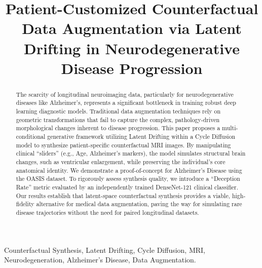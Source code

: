 \documentclass[conference]{IEEEtran}
\begin{document}
\title{Patient-Customized Counterfactual Data Augmentation via Latent Drifting in Neurodegenerative Disease Progression\\
}

\author{
}

\maketitle

\begin{abstract}
The scarcity of longitudinal neuroimaging data, particularly for neurodegenerative diseases like Alzheimer's, represents a significant bottleneck in training robust deep learning diagnostic models. Traditional data augmentation techniques rely on geometric transformations that fail to capture the complex, pathology-driven morphological changes inherent to disease progression. This paper proposes a multi-conditional generative framework utilizing Latent Drifting within a Cycle Diffusion model to synthesize patient-specific counterfactual MRI images. By manipulating clinical ``sliders'' (e.g., Age, Alzheimer's markers), the model simulates structural brain changes, such as ventricular enlargement, while preserving the individual's core anatomical identity. We demonstrate a proof-of-concept for Alzheimer's Disease using the OASIS dataset. To rigorously assess synthesis quality, we introduce a ``Deception Rate'' metric evaluated by an independently trained DenseNet-121 clinical classifier. Our results establish that latent-space counterfactual synthesis provides a viable, high-fidelity alternative for medical data augmentation, paving the way for simulating rare disease trajectories without the need for paired longitudinal datasets.
\end{abstract}

\begin{IEEEkeywords}
Counterfactual Synthesis, Latent Drifting, Cycle Diffusion, MRI, Neurodegeneration, Alzheimer's Disease, Data Augmentation.
\end{IEEEkeywords}
\end{document}
